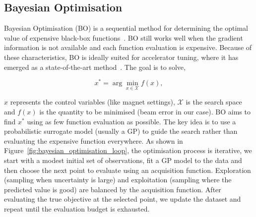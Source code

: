 \subsection{Bayesian Optimisation}
Bayesian Optimisation (BO) is a sequential method for determining the optimal value of expensive black-box functions~\cite{roussel2024bo}. BO still works well when the gradient information 
is not available and each function evaluation is expensive. Because of these characteristics, BO is ideally suited for accelerator tuning, where it has emerged as a state-of-the-art 
method~\cite{jalas2021bolaserplasma,Duris2020bofreelectron}. The goal is to solve,

\begin{equation}
    \label{eq_optFormulation}
    x^* = \arg\min_{x \in \mathcal{X}} f(x),
\end{equation}

$x$ represents the control variables (like magnet settings), $\mathcal{X}$ is the search space and $f(x)$ is the quantity to be minimised (beam error in our case). BO aims to find $x^*$ using as 
few function evaluation as possible. The key idea is to use a probabilistic surrogate model (usually a GP) to guide the search rather than evaluating the expensive function everywhere. 
As shown in Figure~\ref{fig:bayesian_optimisation_loop}, the optimisation process is iterative, we start with a modest initial set of observations, fit a GP model to the data and then choose the next point to evaluate using an acquisition function.
Exploration (sampling when uncertainty is large) and exploitation (sampling where the predicted value is good) are balanced by the acquisition function. After evaluating the true objective at the 
selected point, we update the dataset and repeat until the evaluation budget is exhausted.

